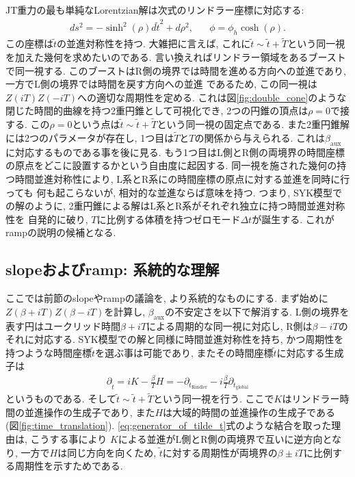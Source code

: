 JT重力の最も単純なLorentzian解は次式のリンドラー座標に対応する:
\begin{align}
	ds^2 = -\sinh^2(\rho)d\tilde{t}^2 + d\rho^2,\hspace{20pt}
	\phi = \phi_h\cosh(\rho).
	\label{eq:Rindler_coordinate}
\end{align}
この座標は$\tilde{t}$の並進対称性を持つ. 
大雑把に言えば, これに$\tilde{t}\sim\tilde{t}+\tilde{T}$という同一視を加えた幾何を求めたいのである. 
言い換えればリンドラー領域をあるブーストで同一視する. 
このブーストはR側の境界では時間を進める方向への並進であり, 一方でL側の境界では時間を戻す方向への並進
であるため, この同一視は$Z(iT)Z(-iT)$への適切な周期性を定める. 
これは図\ref{fig:double_cone}のような閉じた時間的曲線を持つ2重円錐として可視化でき, 
2つの円錐の頂点は$\rho = 0$で接する. 
この$\rho = 0$という点は$\tilde{t}\sim\tilde{t}+\tilde{T}$という同一視の固定点である. 
また2重円錐解には2つのパラメータが存在し, 1つ目は$\tilde{T}$と$T$の関係から与えられる. 
これは$\beta_{\mathrm{aux}}$に対応するものである事を後に見る. 
もう1つ目はL側とR側の両境界の時間座標の原点をどこに設置するかという自由度に起因する. 
同一視を施された幾何の持つ時間並進対称性により, L系とR系にの時間座標の原点に対する並進を同時に行っても
何も起こらないが, 相対的な並進ならば意味を持つ. 
つまり, SYK模型での解のように, 2重円錐による解はL系とR系がそれぞれ独立に持つ時間並進対称性を
自発的に破り, $T$に比例する体積を持つゼロモード$\Delta t$が誕生する. 
これがrampの説明の候補となる. 

\subsection{slopeおよびramp: 系統的な理解}
ここでは前節のslopeやrampの議論を, より系統的なものにする. 
まず始めに$Z(\beta + iT)Z(\beta - iT)$を計算し, $\beta_{\mathrm{aux}}$の不安定さを以下で解消する. 
L側の境界を表す円はユークリッド時間$\beta + iT$による周期的な同一視に対応し, 
R側は$\beta - iT$のそれに対応する. 
SYK模型での解と同様に時間並進対称性を持ち, かつ周期性を持つような時間座標$\tilde{t}$を選ぶ事は可能であり, 
またその時間座標$\tilde{t}$に対応する生成子は
\begin{align}
	\partial_{\tilde{t}}
	= iK - \frac{\beta}{T}H
	= -\partial_{t_{\mathrm{Rindler}}} - i\frac{\beta}{T}\partial_{t_{\mathrm{global}}}
	\label{eq:generator_of_tilde_t}
\end{align}
というものである. 
そして$\tilde{t}\sim\tilde{t} + \tilde{T}$という同一視を行う. 
ここで$K$はリンドラー時間の並進操作の生成子であり, また$H$は大域的時間の並進操作の生成子である
(図\ref{fig:time_translation}). 
\eqref{eq:generator_of_tilde_t}式のような結合を取った理由は, こうする事により
$K$による並進がL側とR側の両境界で互いに逆方向となり, 一方で$H$は同じ方向を向くため, 
$\tilde{t}$に対する周期性が両境界の$\beta \pm iT$に比例する周期性を示すためである. 

